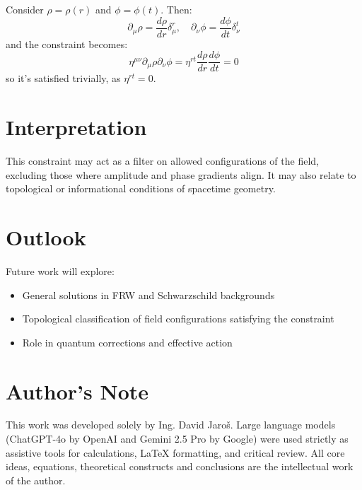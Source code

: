 \documentclass[12pt]{article}
\begin{document}
Consider $\rho = \rho(r)$ and $\phi = \phi(t)$. Then:
\[
\partial_\mu \rho = \frac{d\rho}{dr} \delta^r_\mu, \quad \partial_\nu \phi = \frac{d\phi}{dt} \delta^t_\nu
\]
and the constraint becomes:
\[
\eta^{\mu\nu} \partial_\mu \rho \partial_\nu \phi = \eta^{rt} \frac{d\rho}{dr} \frac{d\phi}{dt} = 0
\]
so it's satisfied trivially, as $\eta^{rt} = 0$.

\section{Interpretation}

This constraint may act as a filter on allowed configurations of the field, excluding those where amplitude and phase gradients align. It may also relate to topological or informational conditions of spacetime geometry.

\section{Outlook}

Future work will explore:
\begin{itemize}
  \item General solutions in FRW and Schwarzschild backgrounds
  \item Topological classification of field configurations satisfying the constraint
  \item Role in quantum corrections and effective action
\end{itemize}


\section*{Author's Note}

This work was developed solely by Ing. David Jaroš.  
Large language models (ChatGPT-4o by OpenAI and Gemini 2.5 Pro by Google) were used strictly as assistive tools for calculations, LaTeX formatting, and critical review.  
All core ideas, equations, theoretical constructs and conclusions are the intellectual work of the author.
\end{document}
